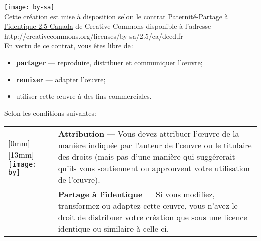 \documentclass[11pt,english,francais]{article}
\begin{document}


\clearpage

\texttt{[image: by-sa]}\\%
Cette création est mise à disposition selon le contrat
\href{http://creativecommons.org/licenses/by-sa/2.5/ca/deed.fr}{%
  Paternité-Partage à l'identique 2.5 Canada} de Creative Commons
disponible à l'adresse \\
http://creativecommons.org/licenses/by-sa/2.5/ca/deed.fr \\
En vertu de
ce contrat, vous êtes libre de:
\begin{itemize}
\item \textbf{partager} --- reproduire, distribuer et communiquer
  l'{\oe}uvre;
\item \textbf{remixer} --- adapter l'{\oe}uvre;
\item utiliser cette {\oe}uvre à des fins commerciales.
\end{itemize}
Selon les conditions suivantes:

  \begin{tabularx}{\linewidth}{@{}lX@{}}
    \raisebox{-9mm}[0mm][13mm]{%
      \texttt{[image: by]}} &
    \textbf{Attribution} --- Vous devez attribuer l'{\oe}uvre de la
    manière indiquée par l'auteur de l'{\oe}uvre ou le titulaire des
    droits (mais pas d'une manière qui suggérerait qu'ils vous
    soutiennent ou
    approuvent votre utilisation de l'{\oe}uvre). \\
    \raisebox{-9mm}{\texttt{[image: sa]}}
    & \textbf{Partage à l'identique} --- Si vous modifiez, transformez
    ou adaptez cette {\oe}uvre, vous n'avez le droit de distribuer
    votre création que sous une licence identique ou similaire à
    celle-ci.
  \end{tabularx}
\end{document}

